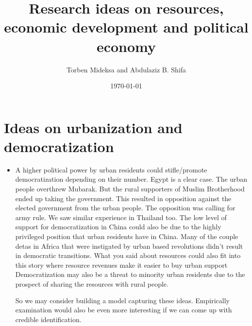 \documentclass[12pt]{article}%
\title{Research ideas on resources, economic development and political economy}
\author{Torben Mideksa and Abdulaziz B. Shifa}
\date{\today}
\begin{document}
\maketitle
\section{Ideas on urbanization and democratization}
\begin{itemize}
    \item A higher political power by urban residents could stifle/promote democratization depending on their number. Egypt is a clear case. The urban people overthrew Mubarak. But the rural supporters of Muslim Brotherhood ended up taking the government. This resulted in opposition against the elected government from the urban people. The opposition was calling for army rule. We saw similar experience in Thailand too. The low level of support for democratization in China could also be due to the highly privileged position that urban residents have in China. Many of the couple detas in Africa that were instigated by urban based revolutions didn't result in democratic transitions. What you said about resources could also fit into this story where resource revenues make it easier to buy urban support
 Democratization may also be a threat to minority urban residents due to the prospect of sharing the resources with rural people.

So we may consider building a model capturing these ideas. Empirically examination would also be even more interesting if we can come up with credible identification. 
\end{itemize}
\end{document}
